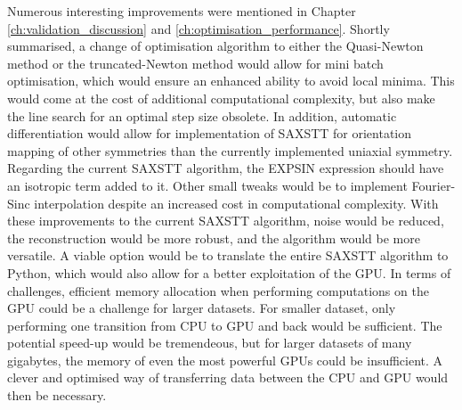 Numerous interesting improvements were mentioned in Chapter \ref{ch:validation_discussion} and \ref{ch:optimisation_performance}.
Shortly summarised, a change of optimisation algorithm to either the Quasi-Newton method or the truncated-Newton method would allow for mini batch optimisation,
which would ensure an enhanced ability to avoid local minima. This would come at the cost of additional computational complexity, but also make the line search for an optimal step size obsolete.
In addition, automatic differentiation would allow for implementation of SAXSTT for orientation mapping of other symmetries than the currently implemented uniaxial symmetry.
Regarding the current SAXSTT algorithm, the EXPSIN expression should have an isotropic term added to it.
Other small tweaks would be to implement Fourier-Sinc interpolation despite an increased cost in computational complexity.
With these improvements to the current SAXSTT algorithm, noise would be reduced, the reconstruction would be more robust, and the algorithm would be more versatile.
A viable option would be to translate the entire SAXSTT algorithm to Python, which would also allow for a better exploitation of the GPU.
In terms of challenges, efficient memory allocation when performing computations on the GPU could be a challenge for larger datasets.
For smaller dataset, only performing one transition from CPU to GPU and back would be sufficient. The potential speed-up would be tremendeous, but for larger datasets of many gigabytes,
the memory of even the most powerful GPUs could be insufficient. A clever and optimised way of transferring data between the CPU and GPU would then be necessary.

